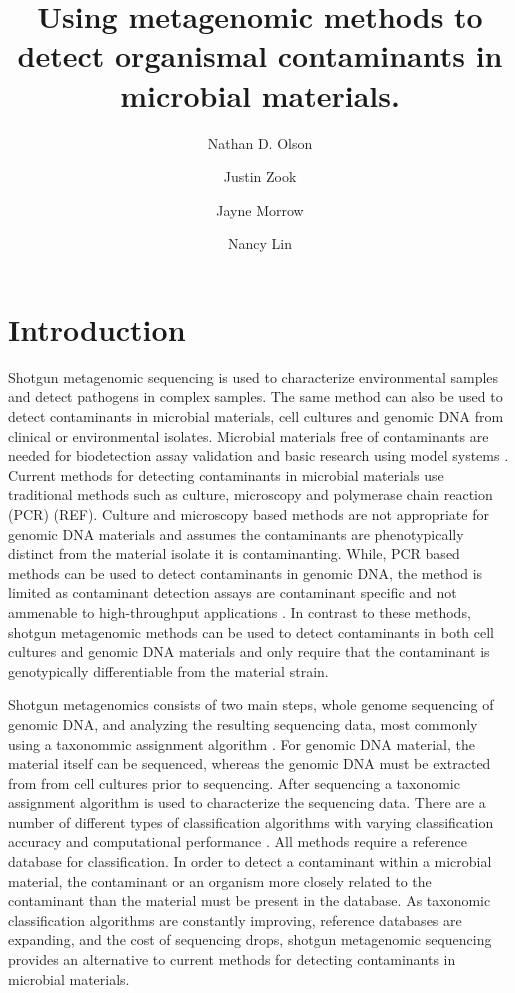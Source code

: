 \documentclass[fleqn,10pt,lineno]{wlpeerj}\usepackage[]{graphicx}\usepackage[]{color}
\title{Using metagenomic methods to detect organismal contaminants in microbial materials.}
\author[1]{Nathan D. Olson}
\author[1]{Justin Zook}
\author[1]{Jayne Morrow}
\author[1]{Nancy Lin}
\affil[1]{Material Measurement Laboratory, National Institute of Standards and Technology}
\begin{document}
\flushbottom
\maketitle
\thispagestyle{empty}

\section*{Introduction}
Shotgun metagenomic sequencing is used to characterize environmental samples and detect pathogens in complex samples.
The same method can also be used to detect contaminants in microbial materials, cell cultures and genomic DNA from clinical or environmental isolates.
Microbial materials free of contaminants are needed for biodetection assay validation \citep{Ieven2013,International2011} and basic research using model systems \citep{Shrestha2013}.
Current methods for detecting contaminants in microbial materials use traditional methods such as culture, microscopy and polymerase chain reaction (PCR) (REF). 
Culture and microscopy based methods are not appropriate for genomic DNA materials and assumes the contaminants are phenotypically distinct from the material isolate it is contaminanting. 
While, PCR based methods can be used to detect contaminants in genomic DNA, the method is limited as contaminant detection assays are contaminant specific and not ammenable to high-throughput applications \citep{heck2016evaluating,Marron2013}. 
In contrast to these methods, shotgun metagenomic methods can be used to detect contaminants in both cell cultures and genomic DNA materials and only require that the contaminant is genotypically differentiable from the material strain. 

Shotgun metagenomics consists of two main steps, whole genome sequencing of genomic DNA, and analyzing the resulting sequencing data, most commonly using a taxonommic assignment algorithm \citep{Thomas2012}.
For genomic DNA material, the material itself can be sequenced, whereas the genomic DNA must be extracted from from cell cultures prior to sequencing. 
After sequencing a taxonomic assignment algorithm is used to characterize the sequencing data. 
There are a number of different types of classification algorithms with varying classification accuracy and computational performance \citep{Bazinet2012,menzel2016fast}.
All methods require a reference database for classification.
In order to detect a contaminant within a microbial material, the contaminant or an organism more closely related to the contaminant than the material must be present in the database. 
As taxonomic classification algorithms are constantly improving, reference databases are expanding, and the cost of sequencing drops, shotgun metagenomic sequencing provides an alternative to current methods for detecting contaminants in microbial materials.
\end{document}

